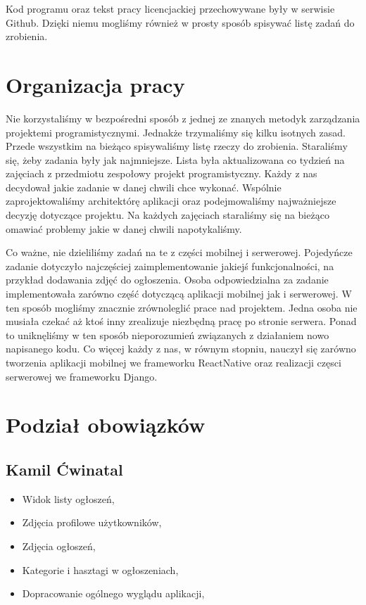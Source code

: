 \documentclass[licencjacka]{pracamgr}
\begin{document}
Kod programu oraz tekst pracy licencjackiej przechowywane były w serwisie Github. Dzięki niemu mogliśmy również w prosty sposób spisywać listę zadań do zrobienia.

\section{Organizacja pracy}

Nie korzystaliśmy w bezpośredni sposób z jednej ze znanych metodyk zarządzania projektemi programistycznymi. Jednakże trzymaliśmy się kilku isotnych zasad. Przede wszystkim na bieżąco spisywaliśmy listę rzeczy do zrobienia. Staraliśmy się, żeby zadania były jak najmniejsze. Lista była aktualizowana co tydzień na zajęciach z przedmiotu zespołowy projekt programistyczny. Każdy z nas decydował jakie zadanie w danej chwili chce wykonać. Wspólnie zaprojektowaliśmy architektórę aplikacji oraz podejmowaliśmy najważniejsze decyzję dotyczące projektu. Na każdych zajęciach staraliśmy się na bieżąco omawiać problemy jakie w danej chwili napotykaliśmy.

Co ważne, nie dzieliliśmy zadań na te z części mobilnej i serwerowej. Pojedyńcze zadanie dotyczyło najczęściej zaimplementowanie jakiejś funkcjonalności, na przykład dodawania zdjęć do ogłoszenia. Osoba odpowiedzialna za zadanie implementowała zarówno część dotyczącą aplikacji mobilnej jak i serwerowej. W ten sposób mogliśmy znacznie zrównoleglić prace nad projektem. Jedna osoba nie musiała czekać aż ktoś inny zrealizuje niezbędną pracę po stronie serwera. Ponad to uniknęliśmy w ten sposób nieporozumień związanych z działaniem nowo napisanego kodu. Co więcej każdy z nas, w równym stopniu, nauczył się zarówno tworzenia aplikacji mobilnej we frameworku ReactNative oraz realizacji częsci serwerowej we frameworku Django.

\section{Podział obowiązków}

\subsection{Kamil Ćwinatal}
\begin{itemize}
\setlength\itemsep{-0.2em}
    \item Widok listy ogłoszeń,
    \item Zdjęcia profilowe użytkowników,
    \item Zdjęcia ogłoszeń,
    \item Kategorie i hasztagi w ogłoszeniach,
    \item Dopracowanie ogólnego wyglądu aplikacji,
\end{itemize}{}
\end{document}
